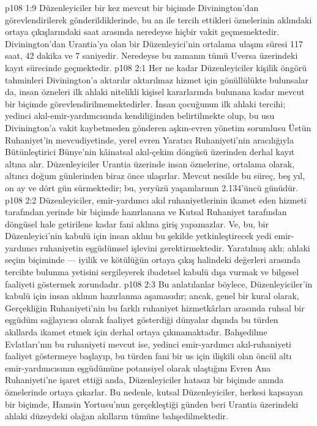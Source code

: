 \vs p108 1:9 Düzenleyiciler bir kez mevcut bir biçimde Divinington’dan görevlendirilerek gönderildiklerinde, bu an ile tercih ettikleri öznelerinin aklındaki ortaya çıkışlarındaki saat arasında neredeyse hiçbir vakit geçmemektedir. Divinington’dan Urantia’ya olan bir Düzenleyici’nin ortalama ulaşım süresi 117 saat, 42 dakika ve 7 saniyedir. Neredeyse bu zamanın tümü Uversa üzerindeki kayıt sürecinde geçmektedir.
\vs p108 2:1 Her ne kadar Düzenleyiciler kişilik öngörü tahminleri Divinington’a aktarılır aktarılmaz hizmet için gönüllülükte bulunsalar da, insan özneleri ilk ahlaki nitelikli kişisel kararlarında bulunana kadar mevcut bir biçimde görevlendirilmemektedirler. İnsan çocuğunun ilk ahlaki tercihi; yedinci akıl\hyp{}emir\hyp{}yardımcısında kendiliğinden belirtilmekte olup, bu usu Divinington’a vakit kaybetmeden gönderen aşkın\hyp{}evren yönetim sorumlusu Üstün Ruhaniyet’in mevcudiyetinde, yerel evren Yaratıcı Ruhaniyeti’nin aracılığıyla Bütünleştirici Bünye’nin kâinatsal akıl\hyp{}çekim döngüsü üzerinden derhal kayıt altına alır. Düzenleyiciler Urantia üzerinde insan öznelerine, ortalama olarak, altıncı doğum günlerinden biraz önce ulaşırlar. Mevcut nesilde bu süreç, beş yıl, on ay ve dört gün sürmektedir; bu, yeryüzü yaşamlarının 2.134’üncü günüdür.
\vs p108 2:2 Düzenleyiciler, emir\hyp{}yardımcı akıl ruhaniyetlerinin ikamet eden hizmeti tarafından yerinde bir biçimde hazırlanana ve Kutsal Ruhaniyet tarafından döngüsel hale getirilene kadar fani aklına giriş yapamazlar. Ve, bu, bir Düzenleyici’nin kabulü için insan aklını bu şekilde yetkinleştirecek yedi emir\hyp{}yardımcı ruhaniyetin eşgüdümsel işlevini gerektirmektedir. Yaratılmış aklı; ahlaki seçim biçiminde --- iyilik ve kötülüğün ortaya çıkış halindeki değerleri arasında tercihte bulunma yetisini sergileyerek ibadetsel kabulü dışa vurmak ve bilgesel faaliyeti göstermek zorundadır.
\vs p108 2:3 Bu anlatılanlar böylece, Düzenleyiciler’in kabulü için insan aklının hazırlanma aşamasıdır; ancak, genel bir kural olarak, Gerçekliğin Ruhaniyeti’nin bu farklı ruhaniyet hizmetkârları arasında ruhsal bir eşgüdüm sağlayıcısı olarak faaliyet gösterdiği dünyalar dışında bu türden akıllarda ikamet etmek için derhal ortaya çıkmamaktadır. Bahşedilme Evlatları’nın bu ruhaniyeti mevcut ise, yedinci emir\hyp{}yardımcı akıl\hyp{}ruhaniyeti faaliyet göstermeye başlayıp, bu türden fani bir us için ilişkili olan öncül altı emir\hyp{}yardımcısının eşgüdümüne potansiyel olarak ulaştığını Evren Ana Ruhaniyeti’ne işaret ettiği anda, Düzenleyiciler hatasız bir biçimde anında öznelerinde ortaya çıkarlar. Bu nedenle, kutsal Düzenleyiciler, herkesi kapsayan bir biçimde, Hamsin Yortusu’nun gerçekleştiği günden beri Urantia üzerindeki ahlaki düzeydeki olağan akılların tümüne bahşedilmektedir.
